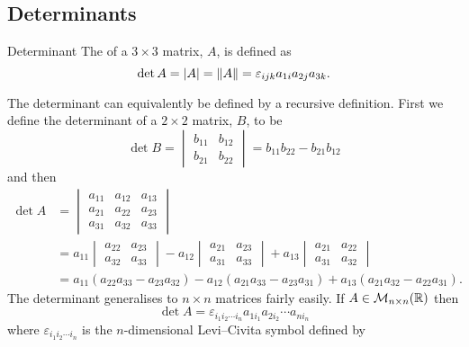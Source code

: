 \documentclass[a4paper]{article}
\newcommand{\nxmMatrices}[3]{\mathcal{M}_{{#1}\times{#2}}({#3})}
\begin{document}
    \subsection{Determinants}
    \begin{definition}{Determinant}{}
        The  of a \(3\times 3\) matrix, \(A\), is defined as
        \[\det A = \abs{A} = \norm{A} = \varepsilon_{ijk}a_{1i}a_{2j}a_{3k}.\]
    \end{definition}
    The determinant can equivalently be defined by a recursive definition.
    First we define the determinant of a \(2\times 2\) matrix, \(B\), to be
    \[
        \det B =
        \begin{vmatrix}
            b_{11} & b_{12}\\
            b_{21} & b_{22}
        \end{vmatrix}
        = b_{11}b_{22} - b_{21}b_{12}
    \]
    and then
    \begin{align*}
        \det A &= \begin{vmatrix}
            a_{11} & a_{12} & a_{13}\\
            a_{21} & a_{22} & a_{23}\\
            a_{31} & a_{32} & a_{33}
        \end{vmatrix}
        \\
        &= a_{11}
        \begin{vmatrix}
            a_{22} & a_{23}\\
            a_{32} & a_{33}
        \end{vmatrix}
        - a_{12}
        \begin{vmatrix}
            a_{21} & a_{23}\\
            a_{31} & a_{33}
        \end{vmatrix}
        + a_{13}
        \begin{vmatrix}
            a_{21} & a_{22}\\
            a_{31} & a_{32}
        \end{vmatrix}
        \\
        &= 
        a_{11}(a_{22}a_{33} - a_{23}a_{32}) - a_{12}(a_{21}a_{33} - a_{23}a_{31}) + a_{13}(a_{21}a_{32} - a_{22}a_{31}).
    \end{align*}
    The determinant generalises to \(n\times n\) matrices fairly easily.
    If \(A\in\nxmMatrices{n}{n}{\reals}\) then
    \[\det A = \varepsilon_{i_1i_2\dotsm i_n} a_{1i_1}a_{2i_2}\dotsm a_{ni_n}\]
    where \(\varepsilon_{i_1i_2\dotsm i_n}\) is the \(n\)-dimensional Levi--Civita symbol defined by
\end{document}
